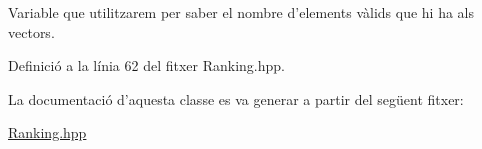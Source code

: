 Variable que utilitzarem per saber el nombre d'elements vàlids que hi ha als vectors. 



Definició a la línia 62 del fitxer Ranking.\-hpp.



La documentació d'aquesta classe es va generar a partir del següent fitxer\-:\begin{DoxyCompactItemize}
\item 
\hyperlink{_ranking_8hpp}{Ranking.\-hpp}\end{DoxyCompactItemize}
